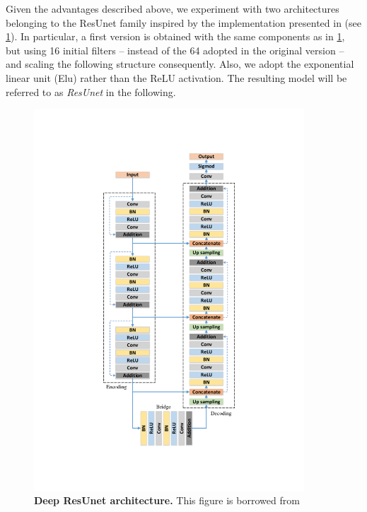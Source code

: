 Given the advantages described above, we experiment with two architectures belonging to the ResUnet family inspired by the implementation presented in  (see \cref{fig:resunet_architecture}).
In particular, a first version is obtained with the same components as in \cref{fig:resunet_architecture}, but using 16 initial filters -- instead of the 64 adopted in the original version \cite{deep_resunet} -- and scaling the following structure consequently.
Also, we adopt the exponential linear unit (Elu) \cite{clevert2015elu} rather than the ReLU activation.
The resulting model will be referred to as \textit{ResUnet} in the following.
\begin{figure}
\centerline{
\includegraphics[width=0.9\textwidth]{figures/130_methods/resunet.pdf}
}
\caption{\textbf{Deep ResUnet architecture.}
This figure is borrowed from \protect {}
} \label{fig:resunet_architecture}
\end{figure}

